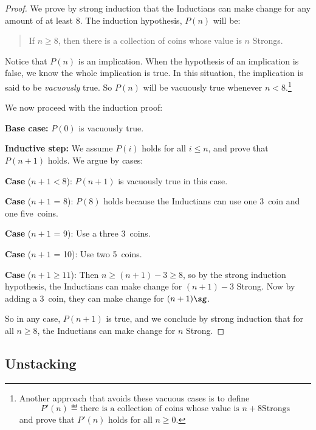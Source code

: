 \begin{proof}

  We prove by strong induction that the Inductians can make change for any
  amount of at least 8\sg.  The induction hypothesis, $P(n)$ will be:
\begin{quote}
If $n \geq 8$, then there is a collection of coins whose value is $n$
Strongs.
\end{quote}

Notice that $P(n)$ is an implication.  When the hypothesis of an
implication is false, we know the whole implication is true.  In this
situation, the implication is said to be \emph{vacuously} true.  So $P(n)$
will be vacuously true whenever $n < 8$.\footnote{Another approach that
avoids these vacuous cases is to define
\[
P'(n) \eqdef \text{there is a collection of coins whose value is $n+8$
Strongs}
\]
and prove that $P'(n)$ holds for all $n \geq 0$.
\iffalse
The solution to
\href{http://courses.csail.mit.edu/6.042/spring06/solutions/cp3fsol.pdf}
{Class Problem 1 from Spring '06, Friday, Feb. 24} uses this approach.\fi
}

We now proceed with the induction proof:

\textbf{Base case:} $P(0)$ is vacuously true.

\textbf{Inductive step:}  We assume $P(i)$ holds for all $i \leq n$, and
prove that $P(n+1)$ holds.  We argue by cases:

\textbf{Case} ($n+1 < 8$): $P(n+1)$ is vacuously true in this case.

\textbf{Case} ($n+1$ = 8): $P(8)$ holds because the Inductians can use one
3\sg\ coin and one five\sg\ coins.

\textbf{Case} ($n+1$ = 9): Use a three 3\sg\ coins.

\textbf{Case} ($n+1$ = 10): Use two 5\sg\ coins.

\textbf{Case} ($n+1 \geq 11$): Then $n \geq (n+1) -3 \geq 8$, so by the
strong induction hypothesis, the Inductians can make change for $(n+1)-3$
Strong.  Now by adding a 3\sg\ coin, they can make change for $(n+1)\sg$.

So in any case, $P(n+1)$ is true, and we conclude by strong induction that
for all $n \geq 8$, the Inductians can make change for $n$ Strong.

\end{proof}


\subsection{Unstacking}

